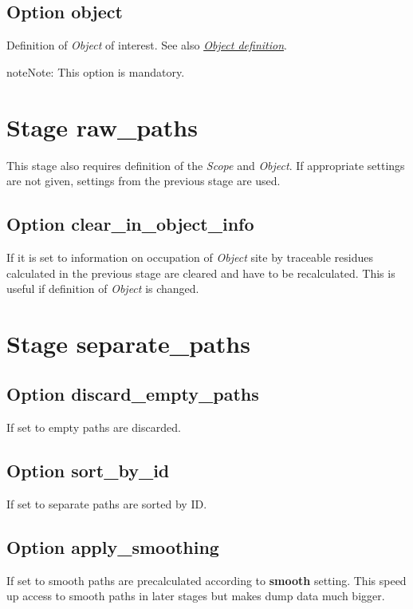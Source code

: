 \documentclass[a4paper,10pt,english]{sphinxmanual}
\begin{document}
\subsection{Option \textbf{object}}
\label{valve/valve_config:option-object}
Definition of \emph{Object} of interest. See also {\hyperref[valve/valve_manual:object-definition]{\emph{Object definition}}}.

\begin{notice}{note}{Note:}
This option is mandatory.
\end{notice}


\section{Stage \textbf{raw\_paths}}
\label{valve/valve_config:stage-raw-paths}
This stage also requires definition of the \emph{Scope} and \emph{Object}. If appropriate settings are not given, settings from the previous stage are used.


\subsection{Option \textbf{clear\_in\_object\_info}}
\label{valve/valve_config:option-clear-in-object-info}
If it is set to  information on occupation of \emph{Object} site by traceable residues calculated in the previous stage are cleared and have to be recalculated. This is useful if definition of \emph{Object} is changed.


\section{Stage \textbf{separate\_paths}}
\label{valve/valve_config:stage-separate-paths}

\subsection{Option \textbf{discard\_empty\_paths}}
\label{valve/valve_config:option-discard-empty-paths}
If set to  empty paths are discarded.


\subsection{Option \textbf{sort\_by\_id}}
\label{valve/valve_config:option-sort-by-id}
If set to  separate paths are sorted by ID.


\subsection{Option \textbf{apply\_smoothing}}
\label{valve/valve_config:option-apply-smoothing}
If set to  smooth paths are precalculated according to \textbf{smooth} setting.
This speed up access to smooth paths in later stages but makes dump data much bigger.
\end{document}
